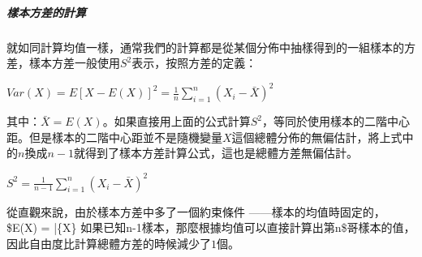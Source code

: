 \documentclass[11pt]{article}
\begin{document}
    \hypertarget{ux6a23ux672cux65b9ux5deeux7684ux8a08ux7b97}{%
\subparagraph{樣本方差的計算}\label{ux6a23ux672cux65b9ux5deeux7684ux8a08ux7b97}}

就如同計算均值一樣，通常我們的計算都是從某個分佈中抽樣得到的一組樣本的方差，樣本方差一般使用\(S^2\)表示，按照方差的定義：

\(Var(X) = E{[X - E(X)]^2} = \frac{1}{n} \displaystyle \sum_{i=1}^{n}(X_i - \bar{X})^2\)

其中：\(\bar{X} = E(X)\)。如果直接用上面的公式計算\(S^2\)，等同於使用樣本的二階中心距。但是樣本的二階中心距並不是隨機變量\(X\)這個總體分佈的無偏估計，將上式中的\(n\)換成\(n-1\)就得到了樣本方差計算公式，這也是總體方差無偏估計。

\(S^2 = \frac{1}{n - 1} \displaystyle \sum_{i=1}^{n}(X_i - \bar{X})^2\)

從直觀來說，由於樣本方差中多了一個約束條件
------樣本的均值時固定的，\$E(X) = \bar\{X\}
\Rightarrow \(如果已知\)n-1\(樣本，那麼根據均值可以直接計算出第\)n\$哥樣本的值，因此自由度比計算總體方差的時候減少了\(1\)個。
\end{document}
